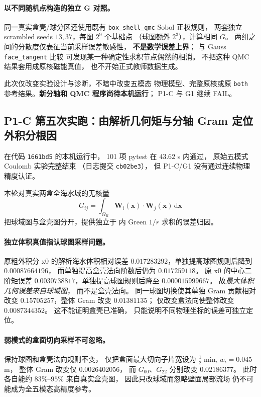 \paragraph{以不同随机点构造的独立 G 对照。}
同一真实盒壳/球分区还使用既有
\texttt{box\_shell\_qmc} Sobol 正权规则，
两套独立 scrambled seeds
$13,37$，每图 $2^9$ 个基础点
（球图额外 $2^3$），计算相同 $G$。
两组之间的分散度仅表征当前采样误差敏感性，
\textbf{不是数学误差上界}；
与 Gauss \texttt{face\_tangent} 比较
可发现某一种确定性求积节点偶然的相消。
不把这种 QMC 结果套用成原核磁能真值，
也不开始正式教师数据生成。

此次仅改变实验设计与诊断，不暗中改变五模态
物理模型、完整原核或原 \texttt{both}
参考结果。\textbf{新分轴和 QMC 程序尚待本机运行}；
P1-C 与 G1 继续 FAIL。


\subsection{P1-C 第五次实跑：由解析几何矩与分轴 Gram 定位外积分根因}
\label{sec:p1-c-physical-outer-reference}
在代码 \texttt{1661bd5} 的本机运行中，
101 项 pytest 在 $43.62$ s 内通过，
原始五模式 Coulomb 实验完整结束
（日志提交 \texttt{cb02be3}），
但 P1-C/G1 没有通过连续物理精度认证。

本轮对真实两盒全海水域的无核量
\[
 G_{ij}=\int_{\Omega_R}
        \bm W_i(\bm x)\cdot\bm W_j(\bm x)\,\mathrm d\bm x
\]
把球域图与盒壳图分开，提供独立于
内 Green $1/r$ 求积的误差归因。

\paragraph{独立体积真值指认球图采样问题。}
原粗外积分 x0 的解析海水体积相对误差
$0.017283292$，单独提高球图规则后降到
$0.00087664196$，
而单独提高盒壳法向阶数后仍为
$0.017259118$。
原 x0 的中心二阶矩误差
$0.0030738817$，单独提高球图规则后降至
$0.000015999667$。
故\emph{最大体积几何误差来自球域图}，
而不是盒壳法向。
同一球图切换使其单独 Gram 贡献相对改变
$0.15705257$，整体 Gram 改变 $0.01381135$；
仅改变盒法向使整体改变 $0.0087344352$。
这不能证明盒壳已准确，
只能说明不同物理坐标的误差可独立定位。

\paragraph{弱模式的盒面切向采样不可忽略。}
保持球图和盒壳法向规则不变，
仅把盒面最大切向子片宽设为
$\tfrac12\min_iw_i=0.045$ m，
整体 Gram 改变仅 $0.0026402056$，
而 $G_{00}$、$G_{22}$ 分别改变
$0.02186377$。
此时各自能约 $83\%$--$95\%$
来自真实盒壳图，
因此只改球域而忽略壁面局部流场
仍不可能成为全五模态高精度参考。

